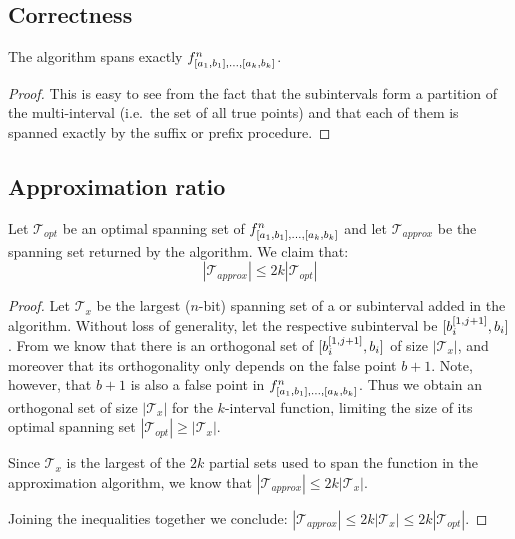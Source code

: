 \subsection{Correctness}
\begin{theorem}
The algorithm spans exactly
$f^n_{[a_1, b_1], \ldots, [a_k, b_k]}$.
\end{theorem}

\begin{proof}
This is easy to see from the fact that the subintervals
form a partition of the multi-interval
(i.e.~the set of all true points)
and that each of them is spanned exactly
by the suffix or prefix procedure.
\end{proof}

\subsection{Approximation ratio}
\begin{theorem}
\label{theorem:2kapproxratio}
Let $\mathcal{T}_{opt}$ be an optimal spanning set of
$f^n_{[a_1, b_1], \ldots, [a_k, b_k]}$
and let $\mathcal{T}_{approx}$ be the spanning set returned
by the algorithm.
We claim that:
\begin{equation}
|\mathcal{T}_{approx}| \leq 2k |\mathcal{T}_{opt}|
\end{equation}
\end{theorem}

\begin{proof}
Let $\mathcal{T}_x$ be the largest ($n$-bit) spanning set
of a  or  subinterval
added in the algorithm.
Without loss of generality,
let the respective subinterval be 
$[b_i^{[1, j+1]}, b_i]$.
From \cite[p.~36]{Dubovsky2012} we know that
there is an orthogonal set
of $[b_i^{[1, j+1]}, b_i]$
of size $|\mathcal{T}_x|$,
and moreover that its orthogonality only depends
on the false point $b+1$.
Note, however, that $b+1$ is also a false point in
$f^n_{[a_1, b_1], \ldots, [a_k, b_k]}$.
Thus we obtain an orthogonal set of size $|\mathcal{T}_x|$
for the $k$-interval function,
limiting the size of its optimal spanning set
$|\mathcal{T}_{opt}| \geq |\mathcal{T}_x|$.

Since $\mathcal{T}_x$ is the largest
of the $2k$ partial sets used to span the function
in the approximation algorithm,
we know that
$|\mathcal{T}_{approx}| \leq 2k |\mathcal{T}_x|$.

Joining the inequalities together we conclude:
$|\mathcal{T}_{approx}| \leq 2k |\mathcal{T}_x| \leq
2k |\mathcal{T}_{opt}|$.
\end{proof}

